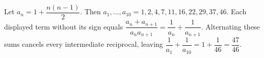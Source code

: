 Let $a_n=1+\dfrac{n(n-1)}{2}$. Then $a_1,\ldots,a_{10}=1,2,4,7,11,16,22,29,37,46$. Each displayed term without its sign equals $\dfrac{a_n+a_{n+1}}{a_na_{n+1}}=\dfrac{1}{a_n}+\dfrac{1}{a_{n+1}}$. Alternating these sums cancels every intermediate reciprocal, leaving $\dfrac{1}{a_1}+\dfrac{1}{a_{10}}=1+\dfrac{1}{46}=\boxed{\dfrac{47}{46}}$.

